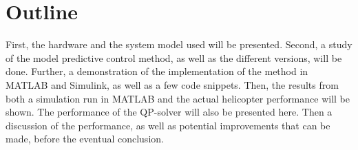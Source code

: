 \section{Outline}

First, the hardware and the system model used will be presented. Second, a study of the model predictive control method, as well as the different versions, will be done. Further, a demonstration of the implementation of the method in MATLAB and Simulink, as well as a few code snippets. Then, the results from both a simulation run in MATLAB and the actual helicopter performance will be shown. The performance of the QP-solver will also be presented here. Then a discussion of the performance, as well as potential improvements that can be made, before the eventual conclusion. 